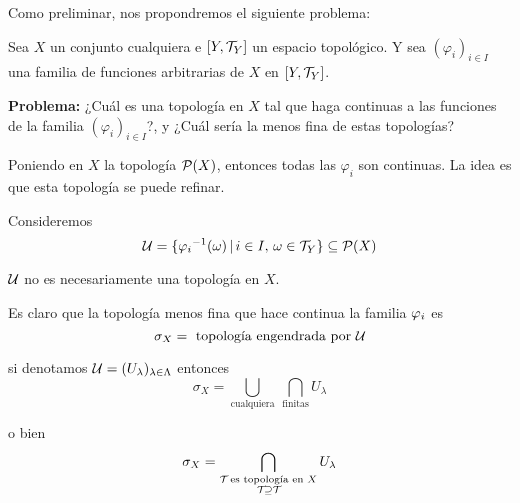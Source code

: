 Como preliminar, nos propondremos el siguiente problema:

Sea $X$ un conjunto cualquiera e $[Y, \TAU[Y] ]$ un espacio topológico. Y sea $(\varphi_{i})_{i \in I}$ una familia de funciones arbitrarias de $X$ en $[Y, \TAU[Y] ]$.

\textbf{Problema:} ¿Cuál es una topología en $X$ tal que haga continuas a las funciones de la familia $(\varphi_{i})_{i \in I}$?, y ¿Cuál sería la menos fina de estas topologías?

Poniendo en $X$ la topología $\cp(X)$, entonces todas las $\varphi_{i}$ son continuas. La idea es que esta topología se puede refinar.

Consideremos $$
\cu = \{ 
{\PHI[i]}^{-1} (\omega) \,|\, i \in I,\, \omega \in \TAU[Y]
\} \subseteq \cp (X)
$$

$\cu$ no es necesariamente una topología en $X$.

Es claro que la topología menos fina que hace continua la familia $\PHI[i]$ es $$
\sigma_X = \text{ topología engendrada por $\cu$}
$$

si denotamos $\cu = (U_{\lambda})_{\lambda \in \Lambda}$ entonces $$
\sigma_{X} 
= \bigcup_{\text{cualquiera}} \ \bigcap_{\text{finitas}} U_{\lambda}
$$

o bien $$
\sigma_{X} 
= \bigcap_{
\begin{subarray}{c}
\TAU \text{ es topología en } X \\ \TAU \supseteq \TAU
\end{subarray}
} U_{\lambda}
$$
